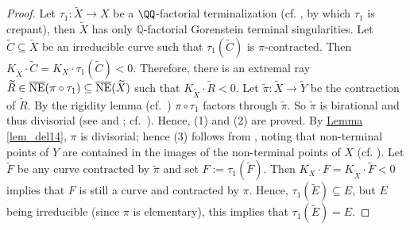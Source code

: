 \begin{proof}
Let $\tau_1:\widetilde{X}\to X$ be a $\QQ$-factorial terminalization (cf. \cite[Corollary 1.4.3]{BCHM10}, by which $\tau_1$ is crepant), then $\widetilde{X}$ has only $\mathbb{Q}$-factorial Gorenstein terminal singularities.
Let $\widetilde{C}\subseteq\widetilde{X}$ be an irreducible curve such that $\tau_1(\widetilde{C})$ is $\pi$-contracted.
Then $K_{\widetilde{X}}\cdot \widetilde{C}=K_X\cdot\tau_1(\widetilde{C})<0$.
Therefore, there is an extremal ray $\widetilde{R}\in\overline{\textup{NE}}(\pi\circ\tau_1)\subseteq\overline{\textup{NE}}(\widetilde{X})$ such that $K_{\widetilde{X}}\cdot\widetilde{R}<0$.
Let $\widetilde{\pi}:\widetilde{X}\to \widetilde{Y}$ be the  contraction of $\widetilde{R}$.
By the rigidity lemma (cf.~\cite[Lemma 1.15, pp.~12-13]{Deb01}) $\pi\circ\tau_1$ factors through $\widetilde{\pi}$.
So $\widetilde{\pi}$ is birational and thus divisorial (see \cite[Theorem 4]{Kaw84} and \cite[Theorem 0]{Ben85}; cf.~\cite[Introduction]{Cut88}). 
Hence, (1) and (2) are proved. 
By {\hyperref[lem_del14]{Lemma  \ref*{lem_del14}}}, $\pi$ is  divisorial; hence (3) follows from \cite[Proposition 3.36]{KM98}, noting that non-terminal points of $Y$  are contained in the images of the non-terminal points of $X$ (cf. \cite[Corollary 3.43, pp.~104-105]{KM98}).
Let $\widetilde{F}$ be any curve contracted by $\widetilde{\pi}$ and set $F:=\tau_1(\widetilde{F})$.
Then $K_X\cdot F=K_{\widetilde{X}}\cdot\widetilde{F}<0$ implies that $F$ is still a curve and contracted by $\pi$.
Hence, $\tau_1(\widetilde{E})\subseteq E$, but $E$ being irreducible (since $\pi$ is elementary), this implies that $\tau_1(\widetilde{E})=E$.


\end{proof}

